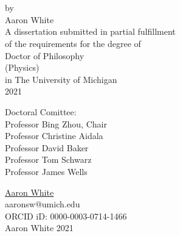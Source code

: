 \begin{titlepage}

\begin{center}
\phantom{x}\\
\vspace{10em}
\textbf{\Large\titleName}\\
\vspace{5em}
by\\
Aaron White\\
\vspace{5em}
{\singlespacing
A dissertation submitted in partial fulfillment\\
of the requirements for the degree of\\
Doctor of Philosophy\\
(Physics)\\
in The University of Michigan\\
2021\\
}
\end{center} 

\vspace{5em}
{\singlespacing
\noindent Doctoral Comittee:\\
\phantom{xxxx} Professor Bing Zhou, Chair \\
\phantom{xxxx} Professor Christine Aidala\\
\phantom{xxxx} Professor David Baker\\
\phantom{xxxx} Professor Tom Schwarz\\
\phantom{xxxx} Professor James Wells\\
}

\end{titlepage}

\clearpage

\begin{center}
\doublespacing
\vspace*{\fill}
\href{http://hg8i.com/thesis/}{Aaron White} \\
aaronsw@umich.edu \\
ORCID iD: 0000-0003-0714-1466 \\
\vspace{3em}
\textcopyright Aaron White 2021
\vspace*{\fill}
\end{center}
